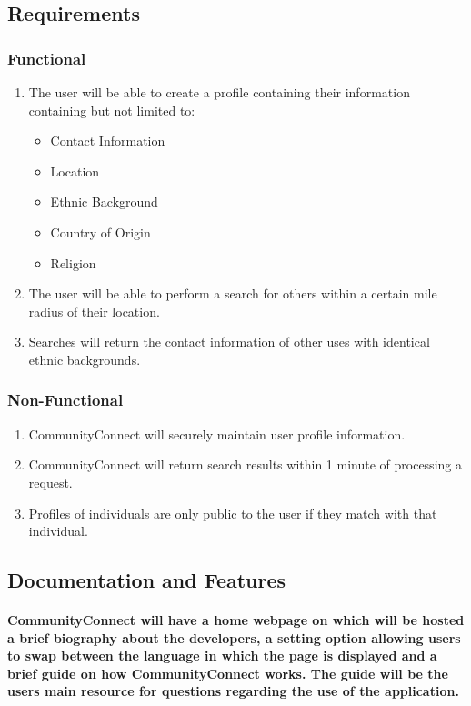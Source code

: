 \documentclass[12pt]{article}
\begin{document}
	\subsection{\bf Requirements}
		\subsubsection{\bf Functional}
			\begin{enumerate}
				\item The user will be able to create a profile containing their information containing but not limited to:
					\begin{itemize}
						\item Contact Information
						\item Location
						\item Ethnic Background
						\item Country of Origin
						\item Religion
					\end{itemize}
				\item The user will be able to perform a search for others within a certain mile radius of their location.
				\item	Searches will return the contact information of other uses with identical ethnic backgrounds.
			\end{enumerate}
		\subsubsection{\bf Non-Functional}
		 \begin{enumerate}
			\item CommunityConnect will securely maintain user profile information.
			\item CommunityConnect will return search results within 1 minute of processing a request.
			\item Profiles of individuals are only public to the user if they match with that individual.
		 \end{enumerate}
	\subsection{\bf Documentation and Features}
		\paragraph{\normalfont \indent CommunityConnect will have a home webpage on which will be hosted a brief biography about the developers, a setting option allowing users to swap between the language in which the page is displayed and a brief guide on how CommunityConnect works. The guide will be the users main resource for questions regarding the use of the application.
		}
\end{document}
